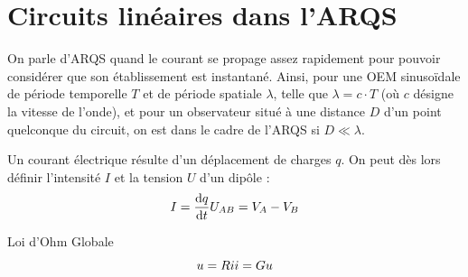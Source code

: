 \documentclass[11pt,a4paper,fleqn,pdftex]{report}
\begin{document}
\section[Circuits linéaires dans l'\acrshort{ARQS}]{Circuits linéaires dans l'\gls{ARQS}} %
\label{sec:circuits_lineaires_dans_l_ARQS}
\begin{dfn}
   On parle d'\gls{ARQS} quand le courant se propage assez rapidement pour pouvoir considérer que son établissement est instantané. \newline
   Ainsi, pour une \gls{OEM} sinusoïdale de période temporelle $T$ et de période spatiale $\lambda$, telle que $\lambda = c\cdot T$ (où $c$ désigne la vitesse de l'onde), et pour un observateur situé à une distance $D$ d'un point quelconque du circuit, on est dans le cadre de l'\gls{ARQS} si $D \ll \lambda$. \\
\end{dfn}
%
\begin{dfn}
Un courant électrique résulte d'un déplacement de charges $q$. On peut dès lors définir l'intensité $I$ et la tension $U$ d'un dipôle : 
\begin{equation}\label{GrandeursElect}
I = \dfrac{\mathrm{d} q}{\mathrm{d} t}\\
U_{AB} = V_A-V_B
\end{equation}
\end{dfn}
%
\begin{theorem}
Loi d'Ohm Globale
\begin{equation}\label{LoiOhm}
u = Ri \\ i = Gu
\end{equation}
\end{theorem}
%
\end{document}
